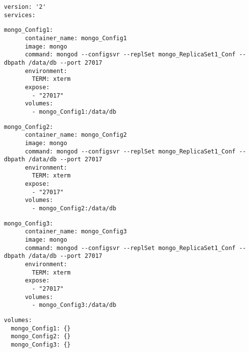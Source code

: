 \begin{lstlisting}[caption=Docker Compose Config Version]
version: '2'
services:
\end{lstlisting}

\begin{lstlisting}[caption=Docker Compose Config 1]
mongo_Config1:
      container_name: mongo_Config1
      image: mongo
      command: mongod --configsvr --replSet mongo_ReplicaSet1_Conf --dbpath /data/db --port 27017
      environment:
        TERM: xterm
      expose:
        - "27017"
      volumes:
        - mongo_Config1:/data/db
\end{lstlisting}

\begin{lstlisting}[caption=Docker Compose Config 2]
mongo_Config2:
      container_name: mongo_Config2
      image: mongo
      command: mongod --configsvr --replSet mongo_ReplicaSet1_Conf --dbpath /data/db --port 27017
      environment:
        TERM: xterm
      expose:
        - "27017"
      volumes:
        - mongo_Config2:/data/db
\end{lstlisting}

\begin{lstlisting}[caption=Docker Compose Config 3]
  mongo_Config3:
      container_name: mongo_Config3
      image: mongo
      command: mongod --configsvr --replSet mongo_ReplicaSet1_Conf --dbpath /data/db --port 27017
      environment:
        TERM: xterm
      expose:
        - "27017"
      volumes:
        - mongo_Config3:/data/db
\end{lstlisting}

\begin{lstlisting}[caption=Docker Compose storage for Config]
volumes:
  mongo_Config1: {}
  mongo_Config2: {}
  mongo_Config3: {}
\end{lstlisting}